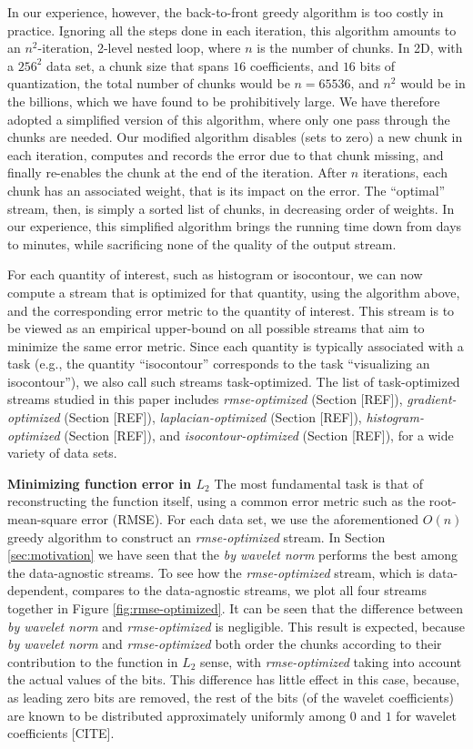 In our experience, however, the back-to-front greedy algorithm is too costly in practice. Ignoring
all the steps done in each iteration, this algorithm amounts to an $n^2$-iteration, 2-level nested
loop, where $n$ is the number of chunks. In 2D, with a $256^2$ data set, a chunk size that spans
$16$ coefficients, and $16$ bits of quantization, the total number of chunks would be $n=65536$, and
$n^2$ would be in the billions, which we have found to be prohibitively large. We have therefore
adopted a simplified version of this algorithm, where only one pass through the chunks are needed.
Our modified algorithm disables (sets to zero) a new chunk in each iteration, computes and records
the error due to that chunk missing, and finally re-enables the chunk at the end of the iteration.
After $n$ iterations, each chunk has an associated weight, that is its impact on the error. The
``optimal'' stream, then, is simply a sorted list of chunks, in decreasing order of weights. In our
experience, this simplified algorithm brings the running time down from days to minutes, while
sacrificing none of the quality of the output stream.

For each quantity of interest, such as histogram or isocontour, we can now compute a stream that is
optimized for that quantity, using the algorithm above, and the corresponding error metric to the
quantity of interest. This stream is to be viewed as an empirical upper-bound on all possible
streams that aim to minimize the same error metric. Since each quantity is typically associated with
a task (e.g., the quantity ``isocontour'' corresponds to the task ``visualizing an isocontour''), we
also call such streams task-optimized. The list of task-optimized streams studied in this paper
includes \emph{rmse-optimized} (Section [REF]), \emph{gradient-optimized} (Section [REF]),
\emph{laplacian-optimized} (Section [REF]), \emph{histogram-optimized} (Section [REF]), and
\emph{isocontour-optimized} (Section [REF]), for a wide variety of data sets.

\textbf{Minimizing function error in $L_2$} The most fundamental task is that of reconstructing the
function itself, using a common error metric such as the root-mean-square error (RMSE). For each
data set, we use the aforementioned $O(n)$ greedy algorithm to construct an \emph{rmse-optimized}
stream. In Section \ref{sec:motivation} we have seen that the \emph{by wavelet norm} performs the
best among the data-agnostic streams. To see how the \emph{rmse-optimized} stream, which is
data-dependent, compares to the data-agnostic streams, we plot all four streams together in Figure
\ref{fig:rmse-optimized}. It can be seen that the difference between \emph{by wavelet norm} and
\emph{rmse-optimized} is negligible. This result is expected, because \emph{by wavelet norm} and
\emph{rmse-optimized} both order the chunks according to their contribution to the function in $L_2$
sense, with \emph{rmse-optimized} taking into account the actual values of the bits. This difference
has little effect in this case, because, as leading zero bits are removed, the rest of the bits (of
the wavelet coefficients) are known to be distributed approximately uniformly among $0$ and $1$ for
wavelet coefficients [CITE].

